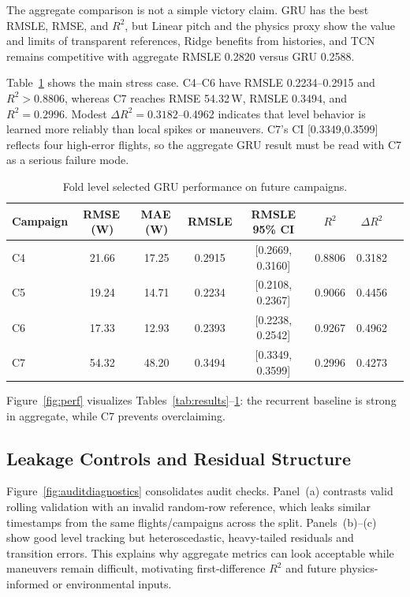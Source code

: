 \documentclass[runningheads,a4paper]{llncs}
\begin{document}
The aggregate comparison is not a simple victory claim. GRU has the best RMSLE, RMSE, and $R^2$, but Linear pitch and the physics proxy show the value and limits of transparent references, Ridge benefits from histories, and TCN remains competitive with aggregate RMSLE 0.2820 versus GRU 0.2588.

Table~\ref{tab:foldgru} shows the main stress case. C4--C6 have RMSLE 0.2234--0.2915 and $R^2>0.8806$, whereas C7 reaches RMSE 54.32\,W, RMSLE 0.3494, and $R^2=0.2996$. Modest $\Delta R^2=0.3182$--0.4962 indicates that level behavior is learned more reliably than local spikes or maneuvers. C7's CI [0.3349,0.3599] reflects four high-error flights, so the aggregate GRU result must be read with C7 as a serious failure mode.

\begin{table}[!htbp]
\caption{Fold level selected GRU performance on future campaigns.}
\label{tab:foldgru}
\centering
{\small
\begin{tabular}{lccccccc}
\toprule
Campaign & RMSE\,(W) & MAE\,(W) & RMSLE & RMSLE 95\% CI & $R^2$ & $\Delta R^2$ \\
\midrule
C4 & 21.66 & 17.25 & 0.2915 & [0.2669, 0.3160] & 0.8806 & 0.3182 \\
C5 & 19.24 & 14.71 & 0.2234 & [0.2108, 0.2367] & 0.9066 & 0.4456 \\
C6 & 17.33 & 12.93 & 0.2393 & [0.2238, 0.2542] & 0.9267 & 0.4962 \\
C7 & 54.32 & 48.20 & 0.3494 & [0.3349, 0.3599] & 0.2996 & 0.4273 \\
\bottomrule
\end{tabular}
}
\end{table}

Figure~\ref{fig:perf} visualizes Tables~\ref{tab:results}--\ref{tab:foldgru}: the recurrent baseline is strong in aggregate, while C7 prevents overclaiming.
\FloatBarrier

\subsection{Leakage Controls and Residual Structure}

Figure~\ref{fig:auditdiagnostics} consolidates audit checks. Panel~(a) contrasts valid rolling validation with an invalid random-row reference, which leaks similar timestamps from the same flights/campaigns across the split. Panels~(b)--(c) show good level tracking but heteroscedastic, heavy-tailed residuals and transition errors. This explains why aggregate metrics can look acceptable while maneuvers remain difficult, motivating first-difference $R^2$ and future physics-informed or environmental inputs.
\end{document}
